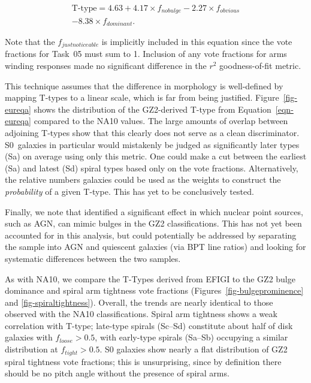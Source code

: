 \documentclass[useAMS,usenatbib]{mn2e}
\begin{document}
\begin{eqnarray}
\label{eqn-eureqa}
\text{T-type} = 4.63 + 4.17\times f_{no bulge} - 2.27\times f_{obvious} \\ \nonumber
- 8.38\times f_{dominant}.
\end{eqnarray}

\noindent Note that the $f_{just noticeable}$ is implicitly included in this equation since the vote fractions for Task~05 must sum to 1. Inclusion of any vote fractions for arms winding responses made no significant difference in the $r^2$ goodness-of-fit metric.

This technique assumes that the difference in morphology is well-defined by mapping T-types to a linear scale, which is far from being justified. Figure~\ref{fig-eureqa} shows the distribution of the GZ2-derived T-type from Equation~\ref{eqn-eureqa} compared to the NA10 values. The large amounts of overlap between adjoining T-types show that this clearly does not serve as a clean discriminator. S0~galaxies in particular would mistakenly be judged as significantly later types (Sa) on average using only this metric. One could make a cut between the earliest (Sa) and latest (Sd) spiral types based only on the vote fractions. Alternatively, the relative numbers galaxies could be used as the weights to construct the {\em probability} of a given T-type. This has yet to be conclusively tested. 

Finally, we note that \citet{sim13} identified a significant effect in which nuclear point sources, such as AGN, can mimic bulges in the GZ2 classifications. This has not yet been accounted for in this analysis, but could potentially be addressed by separating the sample into AGN and quiescent galaxies (via BPT line ratios) and looking for systematic differences between the two samples. 

As with NA10, we compare the T-Types derived from EFIGI to the GZ2 bulge dominance and spiral arm tightness vote fractions (Figures~\ref{fig-bulgeprominence} and \ref{fig-spiraltightness}). Overall, the trends are nearly identical to those observed with the NA10 classifications. Spiral arm tightness shows a weak correlation with T-type; late-type spirals (Sc--Sd) constitute about half of disk galaxies with $f_{loose}>0.5$, with early-type spirals (Sa--Sb) occupying a similar distribution at $f_{tight}>0.5$. S0 galaxies show nearly a flat distribution of GZ2 spiral tightness vote fractions; this is unsurprising, since by definition there should be no pitch angle without the presence of spiral arms.
\end{document}
